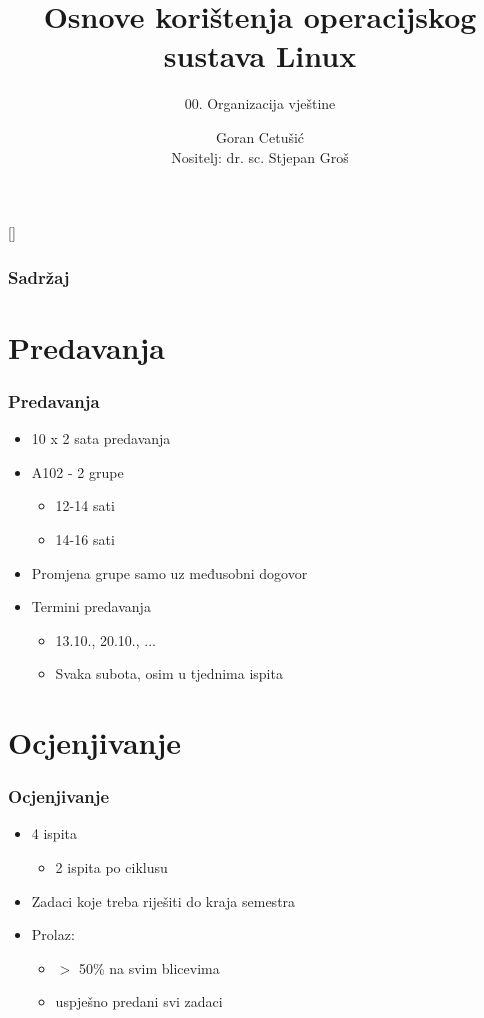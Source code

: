 \documentclass{beamer}
\title{Osnove korištenja operacijskog sustava Linux}
\subtitle{00. Organizacija vještine}
\author[Goran Cetušić]{Goran Cetušić\\{\small Nositelj: dr. sc. Stjepan Groš}}
\institute[FER]{Sveučilište u Zagrebu \\
				Fakultet elektrotehnike i računarstva}
\date{\todayiso}
\begin{document}
{
[] %

\begin{frame}
\maketitle
\end{frame}
}

\begin{frame}
\frametitle{Sadržaj}
\tableofcontents
\end{frame}

\section{Predavanja}
\begin{frame}[t]
\frametitle{Predavanja}
\begin{itemize}
	\item 10 x 2 sata predavanja
	\item A102 - 2 grupe
	\begin{itemize}
		\item 12-14 sati
		\item 14-16 sati
	\end{itemize}
	\item Promjena grupe samo uz međusobni dogovor
	\item Termini predavanja
	\begin{itemize}
		\item 13.10., 20.10., ...
    \item Svaka subota, osim u tjednima ispita
	\end{itemize}
\end{itemize}
\end{frame}

\section{Ocjenjivanje}
\begin{frame}[t]
\frametitle{Ocjenjivanje}
\begin{itemize}
	\item 4 ispita
	\begin{itemize}
		\item 2 ispita po ciklusu
	\end{itemize}
	\item Zadaci koje treba riješiti do kraja semestra
	\item Prolaz:
	\begin{itemize}
		\item $>$ 50\% na svim blicevima
		\item uspješno predani svi zadaci
	\end{itemize}
\end{itemize}
\end{frame}
\end{document}
